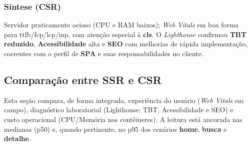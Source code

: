 \subsubsection*{Síntese (CSR)}
Servidor praticamente ocioso (CPU e RAM baixos); \emph{Web Vitals} em boa forma para \acrshort{ttfb}/\acrshort{fcp}/\acrshort{lcp}/\acrshort{inp}, com atenção especial à \textbf{\acrshort{cls}}. O \emph{Lighthouse} confirmou \textbf{TBT reduzido}, \textbf{Acessibilidade} alta e \textbf{SEO} com melhorias de rápida implementação, coerentes com o perfil de \textbf{SPA} e suas responsabilidades no cliente.

\subsection{Comparação entre SSR e CSR}
\label{subsec:comparacao-ssr-csr}

Esta seção compara, de forma integrada, experiência do usuário (\emph{Web Vitals} em campo), diagnóstico laboratorial (Lighthouse: TBT, Acessibilidade e SEO) e custo operacional (CPU/Memória nos contêineres). A leitura está ancorada nas medianas (p50) e, quando pertinente, no p95 dos cenários \textbf{home}, \textbf{busca} e \textbf{detalhe}.

